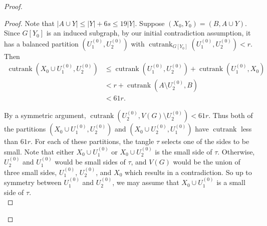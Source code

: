 \documentclass{article}
\theoremstyle{definition}
\begin{document}
\begin{proof}
\begin{proof}
Note that $|A\cup Y|\leq |Y|+6s \leq 19|Y|$. Suppose $(X_0, Y_0) = (B, A\cup Y)$. Since $G[Y_0]$ is an induced subgraph, by our initial contradiction assumption, it has a balanced partition $(U_1^{(0)},U_2^{(0)})$ with $\operatorname{cutrank}_{G[Y_0]}(U_1^{(0)}, U_2^{(0)}) < r$. Then 
\begin{align*}\operatorname{cutrank}(X_0\cup U_1^{(0)}, U_2^{(0)}) &\leq \operatorname{cutrank}(U_1^{(0)}, U_2^{(0)})+ \operatorname{cutrank}(U_1^{(0)}, X_0) \\ &< r+ \operatorname{cutrank}(A \setminus U_2^{(0)}, B) \\ &< 61r.\end{align*}

By a symmetric argument, $\operatorname{cutrank}(U_2^{(0)}, V(G)\setminus U_2^{(0)})<61r$. Thus both of the partitions $(X_0 \cup U_1^{(0)}, U_2^{(0)})$ and $(X_0 \cup U_2^{(0)}, U_1^{(0)})$ have $\operatorname{cutrank}$ less than $61r$. For each of these partitions, the tangle $\tau$ selects one of the sides to be small. Note that either $X_0 \cup U_1^{(0)}$ or $X_0 \cup U_2^{(0)}$ is the small side of $\tau$. Otherwise, $U_2^{(0)}$ and $U_1^{(0)}$ would be small sides of $\tau$, and $V(G)$ would be the union of three small sides, $U_1^{(0)}$, $U_2^{(0)}$, and $X_0$ which results in a contradiction. So up to symmetry between $U_1^{(0)}$ and $U_2^{(0)}$, we may assume that $X_0 \cup U_1^{(0)}$ is a small side of $\tau$. \\


\end{proof}
\end{proof}
\end{document}
